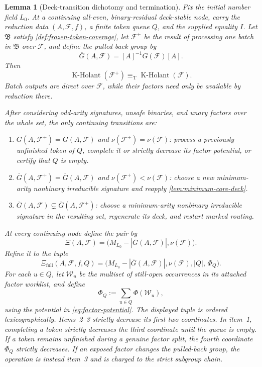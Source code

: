 \documentclass[11pt,letterpaper,onecolumn]{article}
\theoremstyle{plain}
\newtheorem{lemma}[lemma]{Lemma}
\theoremstyle{definition}
\theoremstyle{remark}
\newcommand{\cF}{\mathcal F}
\newcommand{\KHolant}{\operatorname{K\text{-}Holant}}
\newcommand{\equivT}{\equiv_{\mathrm T}}
\begin{document}
\begin{lemma}[Deck-transition dichotomy and termination]
\label{lem:matching-synthesis-measure}
Fix the initial number field \(L_0\).  At a continuing all-even,
binary-residual deck-stable node, carry the reduction data \((A,\cF,f)\), a
finite token queue \(Q\), and the supplied equality \(I\).  Let
\(\mathfrak B\) satisfy \cref{def:frozen-token-coverage}, let
\(\cF^+\) be the result of processing one batch in \(\mathfrak B\) over
\(\cF\), and define
the pulled-back group by
\[
  \overline G(A,\cF)=[A]^{-1}G(\cF)[A].
\]
Then
\begin{equation}
  \KHolant(\cF^+)\equivT\KHolant(\cF).
  \label{eq:deck-transition-equivalence}
\end{equation}
Batch outputs are direct over \(\cF\), while their factors need only be
available by reduction there.

After considering odd-arity signatures, unsafe binaries, and unary factors over the whole set, the only
continuing transitions are:
\begin{enumerate}
\item \(\overline G(A,\cF^+)=\overline G(A,\cF)\) and
      \(\nu(\cF^+)=\nu(\cF)\): process a previously unfinished
      token of \(Q\), complete it or strictly decrease its factor potential,
      or certify that \(Q\) is empty.
\item \(\overline G(A,\cF^+)=\overline G(A,\cF)\) and
      \(\nu(\cF^+)<\nu(\cF)\): choose a new minimum-arity nonbinary irreducible signature and reapply
      \cref{lem:minimum-core-deck}.
\item \(\overline G(A,\cF)\subsetneq\overline G(A,\cF^+)\): choose
      a minimum-arity nonbinary irreducible signature in the resulting set, regenerate its deck, and restart marked
      routing.
\end{enumerate}

At every continuing node define the pair by
\begin{equation*}
 \Xi(A,\cF)
 =\bigl(M_{L_0}-|\overline G(A,\cF)|,\nu(\cF)\bigr).
\end{equation*}
Refine it to the tuple
\begin{equation}
  \Xi_{\mathrm{full}}(A,\cF,f,Q)
  =\bigl(M_{L_0}-|\overline G(A,\cF)|,\nu(\cF),
        |Q|,\,
        \Phi_Q\bigr).
  \label{eq:deck-closure-measure}
\end{equation}
For each \(u\in Q\), let \(\mathcal W_u\) be the multiset of still-open
occurrences in its attached factor worklist, and define
\[
 \Phi_Q:=\sum_{u\in Q}\Phi(\mathcal W_u),
\]
using the potential in \cref{eq:factor-potential}.
The displayed tuple is ordered lexicographically.  Items~2--3 strictly
decrease its first two coordinates.  In item~1, completing a token strictly
decreases the third coordinate until the queue is empty.  If a token remains
unfinished during a genuine factor split, the fourth coordinate \(\Phi_Q\)
strictly decreases.  If an exposed factor changes the pulled-back group, the
operation is instead item~3 and is charged to the strict subgroup chain.
\end{lemma}
\end{document}
